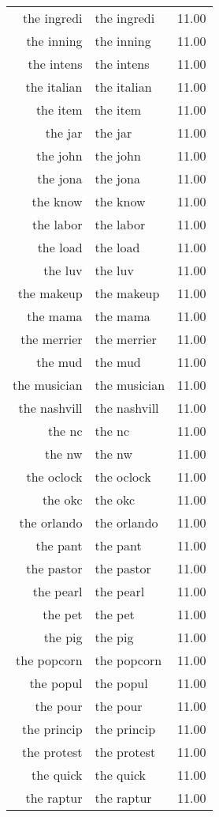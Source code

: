 \begin{table}[ht]
\begin{tabular}{rlr}
  the ingredi & the ingredi & 11.00 \\ 
  the inning & the inning & 11.00 \\ 
  the intens & the intens & 11.00 \\ 
  the italian & the italian & 11.00 \\ 
  the item & the item & 11.00 \\ 
  the jar & the jar & 11.00 \\ 
  the john & the john & 11.00 \\ 
  the jona & the jona & 11.00 \\ 
  the know & the know & 11.00 \\ 
  the labor & the labor & 11.00 \\ 
  the load & the load & 11.00 \\ 
  the luv & the luv & 11.00 \\ 
  the makeup & the makeup & 11.00 \\ 
  the mama & the mama & 11.00 \\ 
  the merrier & the merrier & 11.00 \\ 
  the mud & the mud & 11.00 \\ 
  the musician & the musician & 11.00 \\ 
  the nashvill & the nashvill & 11.00 \\ 
  the nc & the nc & 11.00 \\ 
  the nw & the nw & 11.00 \\ 
  the oclock & the oclock & 11.00 \\ 
  the okc & the okc & 11.00 \\ 
  the orlando & the orlando & 11.00 \\ 
  the pant & the pant & 11.00 \\ 
  the pastor & the pastor & 11.00 \\ 
  the pearl & the pearl & 11.00 \\ 
  the pet & the pet & 11.00 \\ 
  the pig & the pig & 11.00 \\ 
  the popcorn & the popcorn & 11.00 \\ 
  the popul & the popul & 11.00 \\ 
  the pour & the pour & 11.00 \\ 
  the princip & the princip & 11.00 \\ 
  the protest & the protest & 11.00 \\ 
  the quick & the quick & 11.00 \\ 
  the raptur & the raptur & 11.00 \\ 

\end{tabular}
\end{table}
